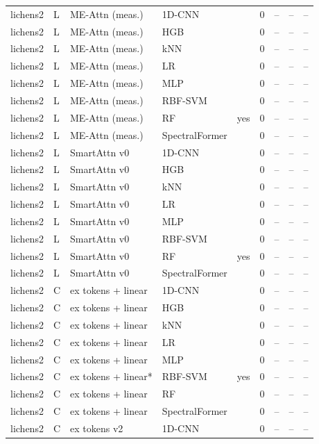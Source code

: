 \begin{tabular}{lllllcccc}
lichens2 & L & ME-Attn (meas.) & 1D-CNN &  & 0 & -- & -- & -- \\
lichens2 & L & ME-Attn (meas.) & HGB &  & 0 & -- & -- & -- \\
lichens2 & L & ME-Attn (meas.) & kNN &  & 0 & -- & -- & -- \\
lichens2 & L & ME-Attn (meas.) & LR &  & 0 & -- & -- & -- \\
lichens2 & L & ME-Attn (meas.) & MLP &  & 0 & -- & -- & -- \\
lichens2 & L & ME-Attn (meas.) & RBF-SVM &  & 0 & -- & -- & -- \\
lichens2 & L & ME-Attn (meas.) & RF & yes & 0 & -- & -- & -- \\
lichens2 & L & ME-Attn (meas.) & SpectralFormer &  & 0 & -- & -- & -- \\
lichens2 & L & SmartAttn v0 & 1D-CNN &  & 0 & -- & -- & -- \\
lichens2 & L & SmartAttn v0 & HGB &  & 0 & -- & -- & -- \\
lichens2 & L & SmartAttn v0 & kNN &  & 0 & -- & -- & -- \\
lichens2 & L & SmartAttn v0 & LR &  & 0 & -- & -- & -- \\
lichens2 & L & SmartAttn v0 & MLP &  & 0 & -- & -- & -- \\
lichens2 & L & SmartAttn v0 & RBF-SVM &  & 0 & -- & -- & -- \\
lichens2 & L & SmartAttn v0 & RF & yes & 0 & -- & -- & -- \\
lichens2 & L & SmartAttn v0 & SpectralFormer &  & 0 & -- & -- & -- \\
lichens2 & C & ex tokens + linear & 1D-CNN &  & 0 & -- & -- & -- \\
lichens2 & C & ex tokens + linear & HGB &  & 0 & -- & -- & -- \\
lichens2 & C & ex tokens + linear & kNN &  & 0 & -- & -- & -- \\
lichens2 & C & ex tokens + linear & LR &  & 0 & -- & -- & -- \\
lichens2 & C & ex tokens + linear & MLP &  & 0 & -- & -- & -- \\
lichens2 & C & ex tokens + linear* & RBF-SVM & yes & 0 & -- & -- & -- \\
lichens2 & C & ex tokens + linear & RF &  & 0 & -- & -- & -- \\
lichens2 & C & ex tokens + linear & SpectralFormer &  & 0 & -- & -- & -- \\
lichens2 & C & ex tokens v2 & 1D-CNN &  & 0 & -- & -- & -- \\

\end{tabular}
